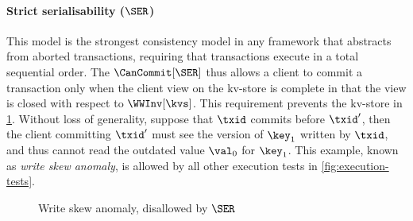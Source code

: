 \paragraph{Strict serialisability (\(\SER\))}  
This model is the strongest consistency model
in any framework that abstracts from aborted transactions, 
requiring that transactions execute in a total sequential order.
The \(\CanCommit[\SER]\) thus allows a client to commit a transaction only 
when the client view on the kv-store is complete
in that the view is closed with respect to \(\WWInv[\kvs]\). 
This requirement prevents the kv-store in  \cref{fig:ser-disallowed}.
Without loss of generality, suppose that \(\txid\) commits before \(\txid'\),
then the client committing \(\txid'\) must see the version of \(\key_1\) written by \(\txid\), 
and thus cannot read the outdated value \(\val_0\) for \(\key_1\). 
This example, known as \emph{write skew anomaly}, 
is allowed by all other execution tests in \cref{fig:execution-tests}.

\begin{figure}
\centering
{}%

\hrulefill

\caption{Write skew anomaly, disallowed by \(\SER\)}
\label{fig:ser-disallowed}
\end{figure}%
